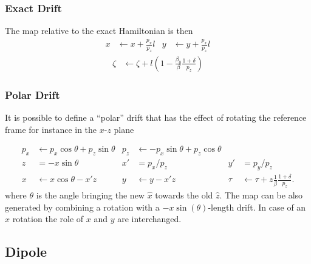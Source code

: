 \subsubsection{Exact Drift}

The map relative to the exact Hamiltonian is then
\begin{align}
  x & \leftarrow x + \frac{p_x}{p_z} l  &
  y & \leftarrow y + \frac{p_x}{p_z} l
\end{align}
\begin{align}
  \zeta & \leftarrow \zeta + l\left(
          1-\frac{\beta_0}{\beta}\frac{1+\delta}{p_z}
          \right)
\end{align}




\subsubsection{Polar Drift}
It is possible to define a ``polar'' drift that has the effect of rotating the reference frame
\cite{forest99} for instance in the $x$-$z$ plane

\begin{align}
p_x & \leftarrow   p_x \cos \theta + p_z \sin\theta &
p_z & \leftarrow - p_x \sin \theta + p_z \cos\theta \\
z   &= -x \sin \theta & x' &= p_x/p_z &  y' &= p_y/p_z \\
x   & \leftarrow x \cos\theta - x' z  &
y   & \leftarrow y - x' z  & \tau & \leftarrow \tau + z\frac{1}{\beta}\frac{1+\delta}{p_z} .
\end{align}
where $\theta$ is the angle bringing the new $\hat x$ towards the old $\hat z$.
The map can be also generated by combining a rotation with a $-x
\sin(\theta)$-length drift. In case of an $\hat x$ rotation the role of $x$ and $y$ are interchanged. 


\subsection{Dipole}

